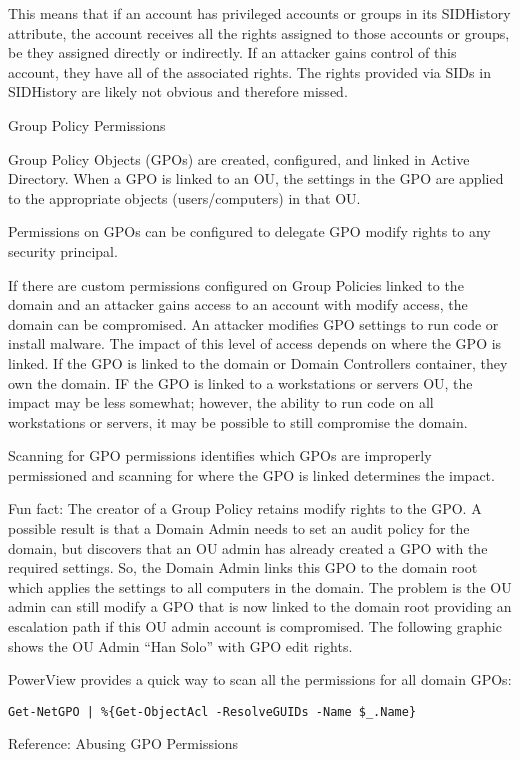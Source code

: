 This means that if an account has privileged accounts or groups in its SIDHistory attribute, the account receives all the rights assigned to those accounts or groups, be they assigned directly or indirectly. If an attacker gains control of this account, they have all of the associated rights. The rights provided via SIDs in SIDHistory are likely not obvious and therefore missed.

Group Policy Permissions

Group Policy Objects (GPOs) are created, configured, and linked in Active Directory. When a GPO is linked to an OU, the settings in the GPO are applied to the appropriate objects (users/computers) in that OU.

Permissions on GPOs can be configured to delegate GPO modify rights to any security principal.

If there are custom permissions configured on Group Policies linked to the domain and an attacker gains access to an account with modify access, the domain can be compromised. An attacker modifies GPO settings to run code or install malware. The impact of this level of access depends on where the GPO is linked. If the GPO is linked to the domain or Domain Controllers container, they own the domain. IF the GPO is linked to a workstations or servers OU, the impact may be less somewhat; however, the ability to run code on all workstations or servers, it may be possible to still compromise the domain.

Scanning for GPO permissions identifies which GPOs are improperly permissioned and scanning for where the GPO is linked determines the impact.

Fun fact: The creator of a Group Policy retains modify rights to the GPO. A possible result is that a Domain Admin needs to set an audit policy for the domain, but discovers that an OU admin has already created a GPO with the required settings. So, the Domain Admin links this GPO to the domain root which applies the settings to all computers in the domain. The problem is the OU admin can still modify a GPO that is now linked to the domain root providing an escalation path if this OU admin account is compromised. The following graphic shows the OU Admin “Han Solo” with GPO edit rights.

PowerView provides a quick way to scan all the permissions for all domain GPOs:

\texttt{Get-NetGPO | \%\{Get-ObjectAcl -ResolveGUIDs -Name \$\_.Name\}}

Reference: Abusing GPO Permissions

